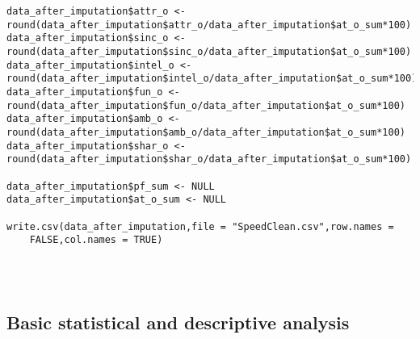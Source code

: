 \begin{verbatim}
data_after_imputation$attr_o <-
round(data_after_imputation$attr_o/data_after_imputation$at_o_sum*100)
data_after_imputation$sinc_o <-
round(data_after_imputation$sinc_o/data_after_imputation$at_o_sum*100)
data_after_imputation$intel_o <-
round(data_after_imputation$intel_o/data_after_imputation$at_o_sum*100)
data_after_imputation$fun_o <-
round(data_after_imputation$fun_o/data_after_imputation$at_o_sum*100)
data_after_imputation$amb_o <-
round(data_after_imputation$amb_o/data_after_imputation$at_o_sum*100)
data_after_imputation$shar_o <-
round(data_after_imputation$shar_o/data_after_imputation$at_o_sum*100)

data_after_imputation$pf_sum <- NULL
data_after_imputation$at_o_sum <- NULL

write.csv(data_after_imputation,file = "SpeedClean.csv",row.names =     
    FALSE,col.names = TRUE)




\end{verbatim}

\subsection{Basic statistical and descriptive analysis}

